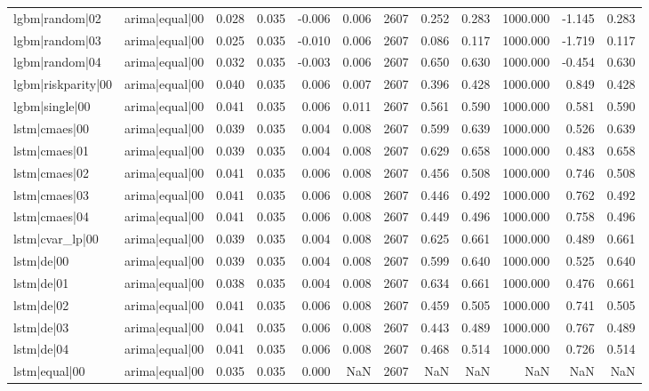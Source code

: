 \begin{table}
\begin{tabular}{llrrrrrrrrrr}
lgbm|random|02 & arima|equal|00 & 0.028 & 0.035 & -0.006 & 0.006 & 2607 & 0.252 & 0.283 & 1000.000 & -1.145 & 0.283 \\
lgbm|random|03 & arima|equal|00 & 0.025 & 0.035 & -0.010 & 0.006 & 2607 & 0.086 & 0.117 & 1000.000 & -1.719 & 0.117 \\
lgbm|random|04 & arima|equal|00 & 0.032 & 0.035 & -0.003 & 0.006 & 2607 & 0.650 & 0.630 & 1000.000 & -0.454 & 0.630 \\
lgbm|riskparity|00 & arima|equal|00 & 0.040 & 0.035 & 0.006 & 0.007 & 2607 & 0.396 & 0.428 & 1000.000 & 0.849 & 0.428 \\
lgbm|single|00 & arima|equal|00 & 0.041 & 0.035 & 0.006 & 0.011 & 2607 & 0.561 & 0.590 & 1000.000 & 0.581 & 0.590 \\
lstm|cmaes|00 & arima|equal|00 & 0.039 & 0.035 & 0.004 & 0.008 & 2607 & 0.599 & 0.639 & 1000.000 & 0.526 & 0.639 \\
lstm|cmaes|01 & arima|equal|00 & 0.039 & 0.035 & 0.004 & 0.008 & 2607 & 0.629 & 0.658 & 1000.000 & 0.483 & 0.658 \\
lstm|cmaes|02 & arima|equal|00 & 0.041 & 0.035 & 0.006 & 0.008 & 2607 & 0.456 & 0.508 & 1000.000 & 0.746 & 0.508 \\
lstm|cmaes|03 & arima|equal|00 & 0.041 & 0.035 & 0.006 & 0.008 & 2607 & 0.446 & 0.492 & 1000.000 & 0.762 & 0.492 \\
lstm|cmaes|04 & arima|equal|00 & 0.041 & 0.035 & 0.006 & 0.008 & 2607 & 0.449 & 0.496 & 1000.000 & 0.758 & 0.496 \\
lstm|cvar\_lp|00 & arima|equal|00 & 0.039 & 0.035 & 0.004 & 0.008 & 2607 & 0.625 & 0.661 & 1000.000 & 0.489 & 0.661 \\
lstm|de|00 & arima|equal|00 & 0.039 & 0.035 & 0.004 & 0.008 & 2607 & 0.599 & 0.640 & 1000.000 & 0.525 & 0.640 \\
lstm|de|01 & arima|equal|00 & 0.038 & 0.035 & 0.004 & 0.008 & 2607 & 0.634 & 0.661 & 1000.000 & 0.476 & 0.661 \\
lstm|de|02 & arima|equal|00 & 0.041 & 0.035 & 0.006 & 0.008 & 2607 & 0.459 & 0.505 & 1000.000 & 0.741 & 0.505 \\
lstm|de|03 & arima|equal|00 & 0.041 & 0.035 & 0.006 & 0.008 & 2607 & 0.443 & 0.489 & 1000.000 & 0.767 & 0.489 \\
lstm|de|04 & arima|equal|00 & 0.041 & 0.035 & 0.006 & 0.008 & 2607 & 0.468 & 0.514 & 1000.000 & 0.726 & 0.514 \\
lstm|equal|00 & arima|equal|00 & 0.035 & 0.035 & 0.000 & NaN & 2607 & NaN & NaN & NaN & NaN & NaN \\

\end{tabular}
\end{table}
